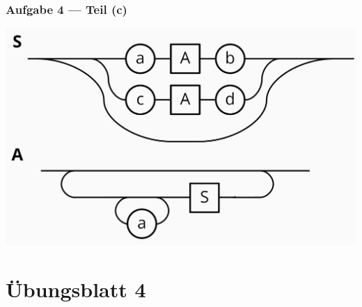 \documentclass{beamer}
\begin{document}
\begin{frame} \frametitle{Aufgabe 4 --- Teil (c)}
	\centering
	\includegraphics[width=\textwidth]{tut03_syntax_dia_4c.jpg}
\end{frame}

\section{Übungsblatt 4}
\end{document}
